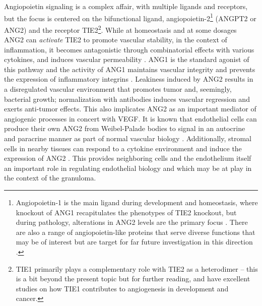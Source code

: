 Angiopoietin signaling is a complex affair, with multiple ligands and receptors, but the focus is centered on the bifunctional ligand, angiopoietin\hyp{}2\footnote{Angiopoietin\hyp{}1 is the main ligand during development and homeostasis, where knockout of ANG1 recapitulates the phenotypes of TIE2 knockout, but during pathology, alterations in ANG2 levels are the primary focus \citep{Akwii2021}. There are also a range of angiopoietin\hyp{}like proteins that serve diverse functions that may be of interest but are target for far future investigation in this direction \citep{Hato2008}.} (ANGPT2 or ANG2) and the receptor TIE2\footnote{TIE1 primarily plays a complementary role with TIE2 as a heterodimer -- this is a bit beyond the present topic but for further reading, \citet{Savant2015} and \citet{LaPorta2018} have excellent studies on how TIE1 contributes to angiogenesis in development and cancer.}. While at homeostasis and at some dosages ANG2 can \textit{activate} TIE2 to promote vascular stability, in the context of inflammation, it becomes antagonistic through combinatorial effects with various cytokines, and induces vascular permeability \citep{Augustin2009}. ANG1 is the standard agonist of this pathway and the activity of ANG1 maintains vascular integrity and prevents the expression of inflammatory integrins \citep{Augustin2009}. Leakiness induced by ANG2 results in a disregulated vascular environment that promotes tumor and, seemingly, bacterial growth; normalization with antibodies induces vascular regression and exerts anti\hyp{}tumor effects. This also implicates ANG2 as an important mediator of angiogenic processes in concert with VEGF. It is known that endothelial cells can produce their own ANG2 from Weibel\hyp{}Palade bodies to signal in an autocrine and paracrine manner as part of normal vascular biology \citep{Fiedler2004}. Additionally, stromal cells in nearby tissues can respond to a cytokine environment and induce the expression of ANG2 \citep{Huang2010, Hato2008, Thurston2012}. This provides neighboring cells and the endothelium itself an important role in regulating endothelial biology and which may be at play in the context of the granuloma.

